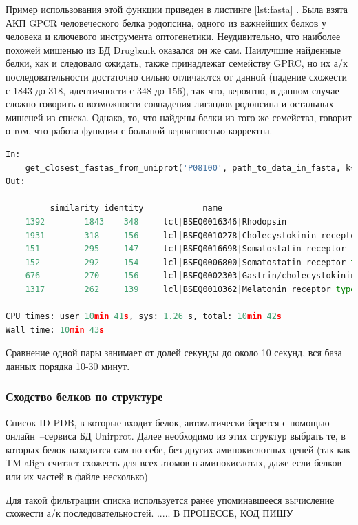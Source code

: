 \documentclass[a4paper,14pt]{article}         %
\begin{document}
Пример использования этой функции приведен в листинге \ref{lst:fasta}
\color{black}. Была взята АКП GPCR человеческого белка родопсина, одного из важнейших белков у человека и ключевого инструмента оптогенетики. Неудивительно, что наиболее похожей мишенью из БД Drugbank оказался он же сам. Наилучшие найденные белки, как и следовало ожидать, также принадлежат семейству GPRC, но их а/к последовательности достаточно сильно отличаются от данной (падение схожести с 1843 до 318, идентичности с 348 до 156), так что, вероятно, в данном случае сложно говорить о возможности совпадения лигандов родопсина и остальных мишеней из списка. Однако, то, что найдены белки из того же семейства, говорит о том, что работа функции с большой вероятностью корректна.
\begin{lstlisting}[language=Python, label={lst:fasta}, caption={Определение сходства мишеней по а/к последовательности посредством Biopython, входные данные~--- ID Uniptor человеческого родопсина из семейства GPCR.}]
In:
	get_closest_fastas_from_uniprot('P08100', path_to_data_in_fasta, k=0, align_matrix='blosum62', sim_or_ident=True)
Out:

		 similarity identity 			name
	1392 	 	1843 	348  	lcl|BSEQ0016346|Rhodopsin
	1931 	 	318 	156 	lcl|BSEQ0010278|Cholecystokinin receptor type A
	151 	 	295 	147 	lcl|BSEQ0016698|Somatostatin receptor type 5
	152 	 	292 	154 	lcl|BSEQ0006800|Somatostatin receptor type 2
	676 	 	270 	156 	lcl|BSEQ0002303|Gastrin/cholecystokinin type B receptor
	1317 	 	262 	139 	lcl|BSEQ0010362|Melatonin receptor type 1A

CPU times: user 10min 41s, sys: 1.26 s, total: 10min 42s
Wall time: 10min 43s
\end{lstlisting}
Сравнение одной пары занимает от долей секунды до около 10 секунд, вся база данных порядка 10-30 минут.
\subsubsection{Сходство белков по структуре}
Список ID PDB, в которые входит белок, автоматически берется с помощью онлайн~--сервиса БД Unirprot. Далее необходимо из этих структур выбрать те, в которых белок находится сам по себе, без других аминокислотных цепей (так как TM-align считает схожесть для всех атомов в аминокислотах, даже если белков или их частей в файле несколько)

Для такой фильтрации списка используется ранее упоминавшееся вычисление схожести а/к последовательностей. .....
\color{orange} В ПРОЦЕССЕ, КОД ПИШУ
\color{black}
\end{document}
